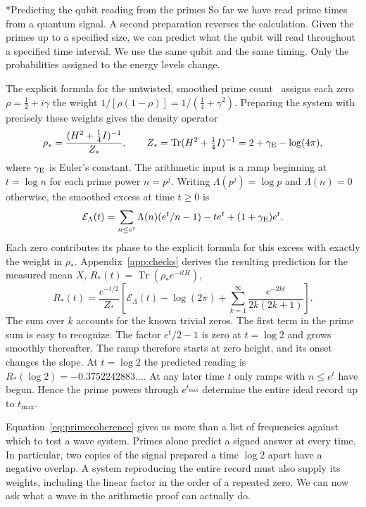 \documentclass[11pt,letterpaper]{article}
\makeatletter
\renewcommand\subsection{\@startsection{subsection}{2}{\z@}{-2.0ex plus -.3ex}{.75ex}{\normalfont\normalsize\itshape}}
\newcommand{\Tr}{\operatorname{Tr}}
\numberwithin{equation}{section}
\makeatother
\begin{document}
\subsection*{Predicting the qubit reading from the primes}
So far we have read prime times from a quantum signal. A second preparation reverses the calculation. Given the primes up to a specified size, we can predict what the qubit will read throughout a specified time interval. We use the same qubit and the same timing. Only the probabilities assigned to the energy levels change.

The explicit formula for the untwisted, smoothed prime count~\cite{primeinput,primeguide} assigns each zero $\rho=\tfrac12+i\gamma$ the weight $1/[\rho(1-\rho)]=1/(\tfrac14+\gamma^2)$. Preparing the system with precisely these weights gives the density operator
\[
 \rho_*=\frac{(H^2+\tfrac14 I)^{-1}}{Z_*},\qquad
 Z_*=\Tr(H^2+\tfrac14 I)^{-1}=2+\gamma_{\rm E}-\log(4\pi),
\]
where $\gamma_{\rm E}$ is Euler's constant. The arithmetic input is a ramp beginning at $t=\log n$ for each prime power $n=p^j$. Writing $\Lambda(p^j)=\log p$ and $\Lambda(n)=0$ otherwise, the smoothed excess at time $t\ge0$ is
\[
 \mathcal E_\Lambda(t)=\sum_{n\le e^t}\Lambda(n)(e^t/n-1)-te^t+(1+\gamma_{\rm E})e^t .
\]
Each zero contributes its phase to the explicit formula for this excess with exactly the weight in $\rho_*$. Appendix~\ref{app:checks} derives the resulting prediction for the measured mean $X$, $R_*(t)=\Tr(\rho_*e^{-itH})$,
\begin{equation}
 R_*(t)=\frac{e^{-t/2}}{Z_*}
 \left[\mathcal E_\Lambda(t)-\log(2\pi)
       +\sum_{k=1}^\infty\frac{e^{-2kt}}{2k(2k+1)}\right].
 \label{eq:primecoherence}
\end{equation}
The sum over $k$ accounts for the known trivial zeros. The first term in the prime sum is easy to recognize. The factor $e^t/2-1$ is zero at $t=\log 2$ and grows smoothly thereafter. The ramp therefore starts at zero height, and its onset changes the slope. At $t=\log 2$ the predicted reading is $R_*(\log 2)=-0.3752242883\ldots$. At any later time $t$ only ramps with $n\le e^t$ have begun. Hence the prime powers through $e^{t_{\max}}$ determine the entire ideal record up to $t_{\max}$.

Equation~\eqref{eq:primecoherence} gives us more than a list of frequencies against which to test a wave system. Primes alone predict a signed answer at every time. In particular, two copies of the signal prepared a time $\log 2$ apart have a negative overlap. A system reproducing the entire record must also supply its weights, including the linear factor in the order of a repeated zero. We can now ask what a wave in the arithmetic proof can actually do.
\end{document}

